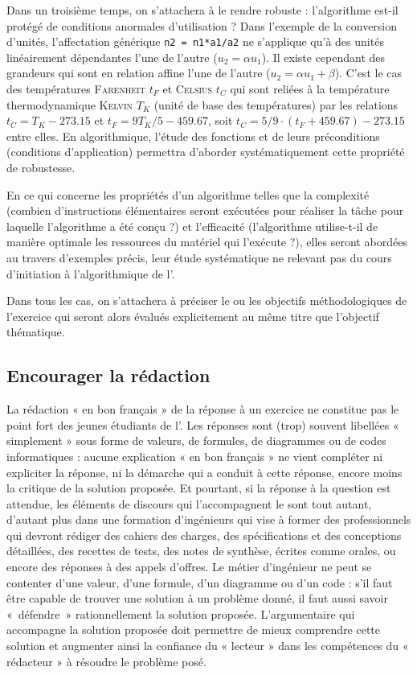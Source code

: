 \documentclass[11pt,a4paper,colorlinks,breaklinks]{article}
\begin{document}
Dans un troisième temps, on s'attachera à le rendre robuste : l'algorithme est-il protégé de conditions anormales d'utilisation ? Dans l'exemple de la conversion d'unités, l'affectation générique \texttt{n2 = n1*a1/a2} ne s'applique qu'à des unités linéairement dépendantes l'une de l'autre ($u_2 = \alpha u_1$). Il existe cependant des grandeurs qui sont en relation affine l'une de l'autre ($u_2 = \alpha u_1 + \beta$). C'est le cas des températures \textsc{Farenheit} $t_F$ et \textsc{Celsius} $t_C$ qui sont reliées à la température thermodynamique \textsc{Kelvin} $T_K$ (unité de base des températures) par les relations $t_C =  T_K - 273.15$ et $t_F = 9T_K/5 - 459.67$, soit $t_C = 5/9\cdot(t_F + 459.67) - 273.15$ entre elles. En algorithmique, l'étude des fonctions et de leurs préconditions (conditions d'application) permettra d'aborder systématiquement cette propriété de robustesse.

En ce qui concerne les propriétés d'un algorithme telles que la complexité (combien d'instruc\-tions élémentaires seront exécutées pour réaliser la tâche pour laquelle l'algorithme a été conçu ?) et l'efficacité (l'algorithme utilise-t-il de manière optimale les ressources du matériel qui l'exécu\-te ?), elles seront abordées au travers d'exemples précis, leur étude systématique ne relevant pas du cours d'initiation à l'algorithmique de l'\enib.

Dans tous les cas, on s'attachera à préciser le ou les objectifs méthodologiques de l'exercice qui seront alors évalués explicitement au même titre que l'objectif thématique.

\subsection{Encourager la rédaction}\label{subsec:redaction}
La rédaction « en bon français » de la réponse à un exercice ne constitue pas le point fort des jeunes étudiants de l'\enib. Les réponses sont (trop) souvent libellées « simplement » sous forme de valeurs, de formules, de diagrammes ou de codes informatiques : aucune explication « en bon français » ne vient compléter ni expliciter la réponse, ni la démarche qui a conduit à cette réponse, encore moins la critique de la solution proposée. Et pourtant, si la réponse à la question est attendue, les éléments de discours qui l'accompagnent le sont tout autant, d'autant plus dans une formation d'ingénieurs qui vise à former des professionnels qui devront rédiger des cahiers des charges, des spécifications et des conceptions détaillées, des recettes de tests, des notes de synthèse, écrites comme orales, ou encore des réponses à des appels d'offres. Le métier d'ingénieur ne peut se contenter d'une valeur, d'une formule, d'un diagramme ou d'un code : s'il faut être capable de trouver une solution à un problème donné, il faut aussi savoir «~défendre~» rationnellement la solution proposée. L'argumentaire qui accompagne la solution proposée doit permettre de mieux comprendre cette solution et augmenter ainsi la confiance du « lecteur » dans les compétences du « rédacteur » à résoudre le problème posé.
\end{document}
